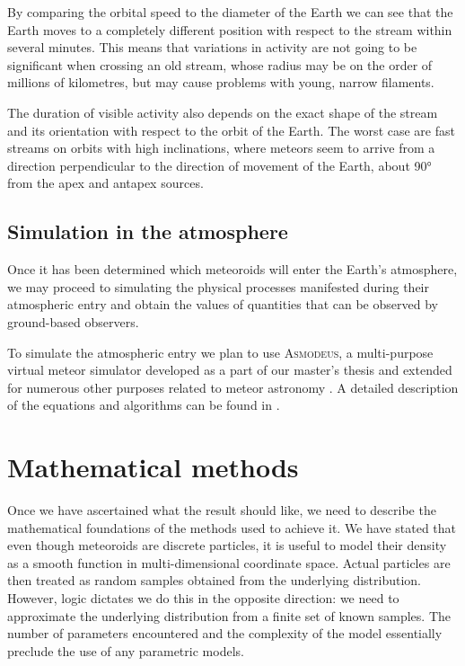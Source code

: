         By comparing the orbital speed to the diameter of the Earth we can see that the Earth moves
        to a completely different position with respect to the stream within several minutes.
        This means that variations in activity are not going to be significant when crossing an old stream,
        whose radius may be on the order of millions of kilometres, but may cause problems with young, narrow filaments.

        The duration of visible activity also depends on the exact shape of the stream and its orientation with respect to the orbit of the Earth.
        The worst case are fast streams on orbits with high inclinations, where meteors seem to arrive
        from a direction perpendicular to the direction of movement of the Earth, about \ang{90} from the apex and antapex sources.

    \subsection{Simulation in the atmosphere} \label{mia}
        Once it has been determined which meteoroids will enter the Earth's atmosphere, we may proceed to simulating
        the physical processes manifested during their atmospheric entry and obtain the values of quantities
        that can be observed by ground-based observers.

        To simulate the atmospheric entry we plan to use \textsc{Asmodeus},
        a multi-purpose virtual meteor simulator developed as a part of our master's thesis and extended for numerous
        other purposes related to meteor astronomy \citep{balaz-thesis}. A detailed description
        of the equations and algorithms can be found in \citep{balaz+2020}.

\section{Mathematical methods} \label{mm}
    Once we have ascertained what the result should like, we need to describe the mathematical foundations of the methods used to achieve it.
    We have stated that even though meteoroids are discrete particles, it is useful to model their density
    as a smooth function in multi-dimensional coordinate space.
    Actual particles are then treated as random samples obtained from the underlying distribution.
    However, logic dictates we do this in the opposite direction: we need to approximate
    the underlying distribution from a finite set of known samples.
    The number of parameters encountered and the complexity of the model essentially preclude the use of any parametric models.

